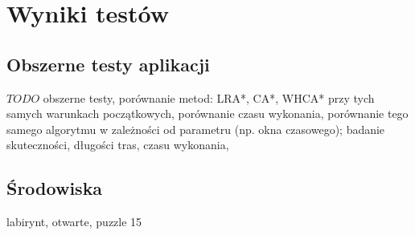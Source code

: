 \chapter{Wyniki testów}
\label{ch:tests}

\section{Obszerne testy aplikacji}
$TODO$ obszerne testy, porównanie metod: LRA*, CA*, WHCA* przy tych samych warunkach początkowych, porównanie czasu wykonania, porównanie tego samego algorytmu w zależności od parametru (np. okna czasowego); badanie skuteczności, długości tras, czasu wykonania, 

\section{Środowiska}
labirynt, otwarte, puzzle 15
